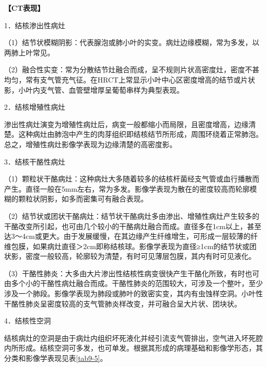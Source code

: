 \textbf{【CT表现】}

1．结核渗出性病灶

（1）结节状模糊阴影：代表腺泡或肺小叶的实变。病灶边缘模糊，常为多发，以两肺上叶常见。

（2）融合性实变：常为分散结节灶融合而成，呈不规则片状高密度灶，密度不甚均匀，常有支气管充气征。在HRCT上常显示小叶中心区密度增高的结节或片状影，小叶内支气管、血管壁增厚呈葡萄串样为典型表现。

2．结核增殖性病灶

渗出性病灶演变为增殖性病灶后，病变一般都缩小而局限，且密度增高，边缘清楚。这种病灶由肺泡中产生的肉芽组织即结核结节所形成，周围环绕着正常肺泡。总之，增殖性病灶影像学表现为边缘清楚的高密度影。

3．结核干酪性病灶

（1）颗粒状干酪病灶：这种病灶大多随着较多的结核杆菌经支气管或血行播散而产生。直径一般在5mm左右，常为多发。影像学表现为散在的密度较高而轮廓模糊的颗粒状阴影，如多而密集可有融合表现。

（2）结节状或团状干酪病灶：结节状干酪病灶多由渗出、增殖性病灶产生较多的干酪改变所引起，也可由几个较小的干酪病灶融合而成。直径多在1cm以上，甚至达3～4cm或更大。由于发展缓慢，在其边缘产生纤维增生，可形成一层较薄的纤维包膜，如果病灶直径＞2cm即称结核球。影像学表现为直径≥1cm的结节状或团状影，密度一般较高，轮廓较为清楚，有时可见薄层包膜，其内有时可见液化。

（3）干酪性肺炎：大多由大片渗出性结核性病变很快产生干酪化所致，有时也可由多个小的干酪性病灶融合而成。干酪性肺炎的范围较大，可涉及一个整叶，至少涉及一个肺段。影像学表现为肺段或肺叶的致密实变，其内有虫蚀样空洞。小叶性干酪性肺炎呈密度较高的支气管肺炎样改变，并可融合呈大片状、团块状。

4．结核性空洞

结核病灶的空洞是由于病灶内组织坏死液化并经引流支气管排出，空气进入坏死腔内所形成。结核空洞可多发，也可单发。根据其形成的病理基础和影像学形态，其分类和影像学表现见表\ref{tab9-5}。

